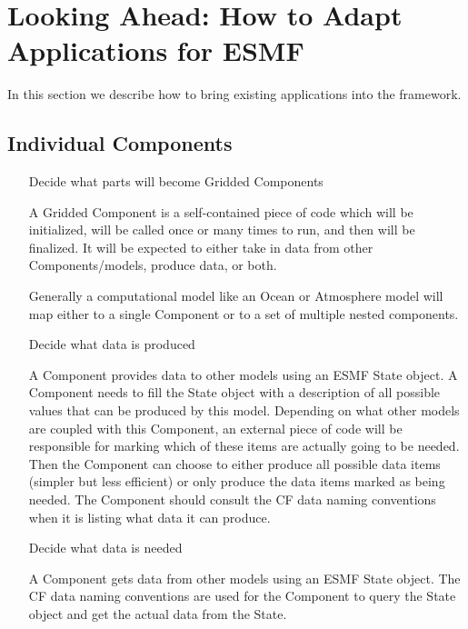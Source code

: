 
\section{Looking Ahead:  How to Adapt Applications for ESMF}
\label{sec:Adoption}

In this section we describe how to bring existing applications into the framework.

\subsection{Individual Components}

\begin{enumerate}

\item[Decide what parts will become Gridded Components]

A Gridded Component is a self-contained
piece of code which will be initialized, will be called once or many times
to run, and then will be finalized.  It will be expected to either take in
data from other Components/models, produce data, or both.

Generally a computational model like an Ocean or Atmosphere model will
map either to a single Component or to a set of multiple nested
components.

\item[Decide what data is produced]

A Component provides data to other models using an ESMF State
object.  A Component needs to fill the State object with a description of
all possible values that can be produced by this model.  Depending on what
other models are coupled with this Component, an external piece of code
will be responsible for marking which of these items are actually going to
be needed.  Then the Component can choose to either produce all possible
data items (simpler but less efficient) or only produce the data items
marked as being needed.  The Component should consult the CF data naming
conventions when it is listing what data it can produce.

\item[Decide what data is needed]

A Component gets data from other models using an ESMF State object.
The CF data naming conventions are used for the Component to query
the State object and get the actual data from the State.


\end{enumerate}
